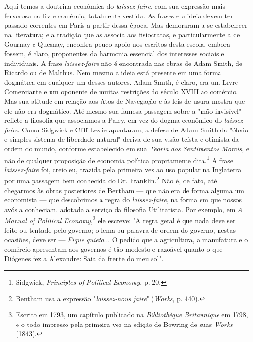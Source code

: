 \documentclass[12pt]{article}
\begin{document}
Aqui temos a doutrina econômica do \textit{laissez-faire}, com sua expressão mais fervorosa no livre comércio, totalmente vestida. As frases e a ideia devem ter passado correntes em Paris a partir dessa época. Mas demoraram a se estabelecer na literatura; e a tradição que as associa aos fisiocratas, e particularmente a de Gournay e Quesnay, encontra pouco apoio nos escritos desta escola, embora fossem, é claro, proponentes da harmonia essencial dos interesses sociais e individuais. A frase \textit{laissez-faire} não é encontrada nas obras de Adam Smith, de Ricardo ou de Malthus. Nem mesmo a ideia está presente em uma forma dogmática em qualquer um desses autores. Adam Smith, é claro, era um Livre-Comerciante e um oponente de muitas restrições do século XVIII ao comércio. Mas sua atitude em relação aos Atos de Navegação e às leis de usura mostra que ele não era dogmático. Até mesmo sua famosa passagem sobre a "mão invisível" reflete a filosofia que associamos a Paley, em vez do dogma econômico do \textit{laissez-faire}. Como Sidgwick e Cliff Leslie apontaram, a defesa de Adam Smith do "óbvio e simples sistema de liberdade natural" deriva de sua visão teísta e otimista da ordem do mundo, conforme estabelecido em sua \textit{Teoria dos Sentimentos Morais}, e não de qualquer proposição de economia política propriamente dita.\footnote{Sidgwick, \textit{Principles of Political Economy}, p. 20.} A frase \textit{laissez-faire} foi, creio eu, trazida pela primeira vez ao uso popular na Inglaterra por uma passagem bem conhecida do Dr. Franklin.\footnote{Bentham usa a expressão "\textit{laissez-nous faire}" (\textit{Works}, p. 440).} Não é, de fato, até chegarmos às obras posteriores de Bentham — que não era de forma alguma um economista — que descobrimos a regra do \textit{laissez-faire}, na forma em que nossos avós a conheciam, adotada a serviço da filosofia Utilitarista. Por exemplo, em \textit{A Manual of Political Economy},\footnote{Escrito em 1793, um capítulo publicado na \textit{Bibliothèque Britannique} em 1798, e o todo impresso pela primeira vez na edição de Bowring de suas \textit{Works} (1843).} ele escreve: "A regra geral é que nada deve ser feito ou tentado pelo governo; o lema ou palavra de ordem do governo, nestas ocasiões, deve ser — \textit{Fique quieto}... O pedido que a agricultura, a manufatura e o comércio apresentam aos governos é tão modesto e razoável quanto o que Diógenes fez a Alexandre: Saia da frente do meu sol".
\end{document}
